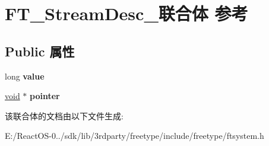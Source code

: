 \hypertarget{union_f_t___stream_desc__}{}\section{F\+T\+\_\+\+Stream\+Desc\+\_\+联合体 参考}
\label{union_f_t___stream_desc__}
\subsection*{Public 属性}
\begin{DoxyCompactItemize}
\item 
\mbox{\label{union_f_t___stream_desc___a1a94493032faef1c3ed7bc33816ce90c}} 
long {\bfseries value}
\item 
\mbox{\label{union_f_t___stream_desc___a410ed102dc377fb9a5b9c950c3f863dc}} 
\hyperlink{interfacevoid}{void} $\ast$ {\bfseries pointer}
\end{DoxyCompactItemize}


该联合体的文档由以下文件生成\+:\begin{DoxyCompactItemize}
\item 
E\+:/\+React\+O\+S-\/0../sdk/lib/3rdparty/freetype/include/freetype/ftsystem.\+h\end{DoxyCompactItemize}
